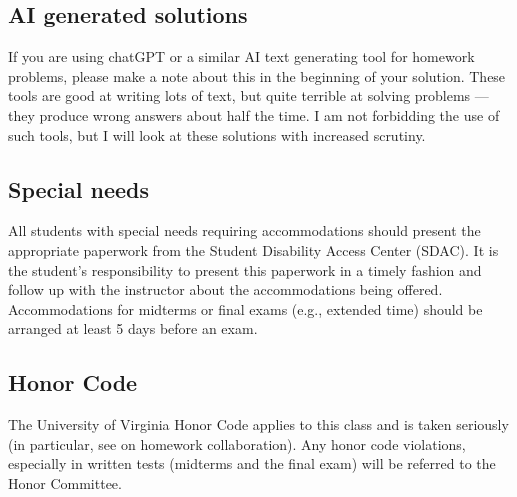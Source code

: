 \documentclass[oneside,11pt]{amsart}
\begin{document}
\subsection{AI generated solutions}

If you are using chatGPT or a similar AI text generating tool for homework problems, please make a note about 
this in the beginning of your solution. These tools are good at writing lots of text, but quite terrible at 
solving problems --- they produce wrong answers about half the time. I am not forbidding the use of such tools, but I will 
look at these solutions with increased scrutiny.

\subsection{Special needs}

All students with special needs requiring accommodations should present the
appropriate paperwork from the Student Disability Access Center (SDAC). It is
the student's responsibility to present this paperwork in a timely fashion and
follow up with the instructor about the accommodations being offered.
Accommodations for midterms or final exams (e.g., extended time) should be arranged at
least 5 days before an exam.

\subsection{Honor Code} The University of Virginia Honor Code applies to this
class and is taken seriously (in particular, 
see  on homework collaboration).
Any honor code violations,
especially in written tests (midterms and the final exam)
will be referred to the
Honor Committee.
\end{document}
